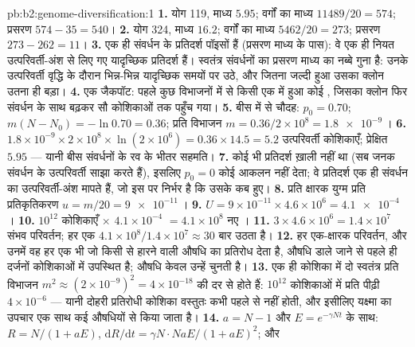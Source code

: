 \begin{solution}{pb:b2:genome-diversification:1}
\textbf{1.} योग 119, माध्य $5.95$; वर्गों का माध्य $11489/20 = 574$;
प्रसरण $574 - 35 = 540$।
\textbf{2.} योग 324, माध्य $16.2$; वर्गों का माध्य $5462/20 = 273$;
प्रसरण $273 - 262 = 11$।
\textbf{3.} एक ही संवर्धन के प्रतिदर्श पॉइसों हैं (प्रसरण माध्य के
पास): वे एक ही नियत उत्परिवर्ती-अंश से लिए गए यादृच्छिक प्रतिदर्श हैं।
स्वतंत्र संवर्धनों का प्रसरण माध्य का नब्बे गुना है: उनके उत्परिवर्ती
वृद्धि के दौरान भिन्न-भिन्न यादृच्छिक समयों पर उठे, और 
जितना जल्दी हुआ उसका क्लोन उतना ही बड़ा।
\textbf{4.} एक जैकपॉट: पहले कुछ विभाजनों में से किसी एक में हुआ कोई ,
जिसका क्लोन फिर संवर्धन के साथ बढ़कर सौ कोशिकाओं तक पहुँच गया।
\textbf{5.} बीस में से चौदह: $p_0 = 0.70$; $m(N - N_0) = -\ln 0.70
= 0.36$; प्रति विभाजन $m = 0.36/2\times 10^{8} = \qty{1.8e-9}{}$।
\textbf{6.} $1.8\times 10^{-9}\times 2\times 10^{8}\times \ln(2\times
10^{6}) = 0.36\times 14.5 = 5.2$ उत्परिवर्ती कोशिकाएँ; प्रेक्षित $5.95$
--- यानी बीस संवर्धनों के रव के भीतर सहमति।
\textbf{7.} कोई भी प्रतिदर्श ख़ाली नहीं था (सब जनक संवर्धन के
उत्परिवर्ती साझा करते हैं), इसलिए $p_0 = 0$ कोई आकलन नहीं देता; वे
प्रतिदर्श एक ही संवर्धन का उत्परिवर्ती-अंश मापते हैं, जो इस पर निर्भर है
कि उसके  कब हुए।
\textbf{8.} प्रति क्षारक युग्म प्रति प्रतिकृतिकरण $u = m/20 = \qty{9e-11}{}$।
\textbf{9.} $U = 9\times 10^{-11}\times 4.6\times 10^{6} =
\qty{4.1e-4}{}$।
\textbf{10.} $10^{12}$ कोशिकाएँ $\times$ $4.1\times 10^{-4}$ $= 4.1\times
10^{8}$ नए ।
\textbf{11.} $3\times 4.6\times 10^{6} = 1.4\times 10^{7}$ संभव
परिवर्तन; हर एक $4.1\times 10^{8}/1.4\times 10^{7} \approx 30$
बार उठता है।
\textbf{12.} हर एक-क्षारक परिवर्तन, और उनमें वह हर एक भी जो किसी
 से हारने वाली औषधि का प्रतिरोध देता है, औषधि डाले
जाने से पहले ही दर्जनों कोशिकाओं में उपस्थित है; औषधि केवल उन्हें
चुनती है।
\textbf{13.} एक ही कोशिका में दो स्वतंत्र  प्रति विभाजन
$m^2 \approx (2\times 10^{-9})^2 = 4\times 10^{-18}$ की दर से होते हैं:
$10^{12}$ कोशिकाओं में प्रति पीढ़ी $4\times 10^{-6}$ --- यानी दोहरी
प्रतिरोधी कोशिका वस्तुतः कभी पहले से नहीं होती, और इसीलिए
यक्ष्मा का उपचार एक साथ कई औषधियों से किया जाता है।
\textbf{14.} $a = N - 1$ और $E = e^{-\gamma Nt}$ के साथ: $R = N/(1 +
aE)$, $\mathrm{d}R/\mathrm{d}t = \gamma N\cdot NaE/(1 + aE)^2$; और

\end{solution}
